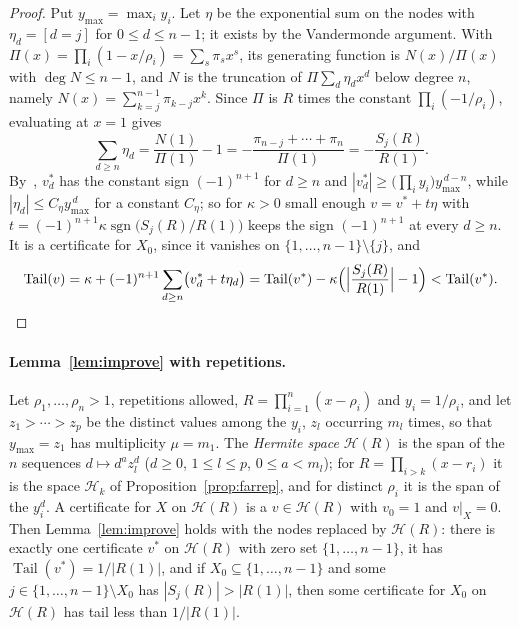 \documentclass[11pt]{article}
\theoremstyle{definition}
\theoremstyle{plain}
\DeclareMathOperator{\Tail}{Tail}
\DeclareMathOperator{\sgn}{sgn}
\begin{document}
\begin{proof}
Put $y_{\max}=\max_iy_i$.  Let $\eta$ be the exponential sum on the nodes with
$\eta_d=[d=j]$ for $0\le d\le n-1$; it exists by the Vandermonde argument.
With $\Pi(x)=\prod_i(1-x/\rho_i)=\sum_s\pi_sx^s$, its generating function is
$N(x)/\Pi(x)$ with $\deg N\le n-1$, and $N$ is the truncation of
$\Pi\sum_d\eta_dx^d$ below degree $n$, namely
$N(x)=\sum_{k=j}^{n-1}\pi_{k-j}x^k$.  Since $\Pi$ is $R$ times the constant
$\prod_i(-1/\rho_i)$, evaluating at $x=1$ gives
\[
  \sum_{d\ge n}\eta_d=\frac{N(1)}{\Pi(1)}-1
  =-\frac{\pi_{n-j}+\cdots+\pi_n}{\Pi(1)}
  =-\frac{S_j(R)}{R(1)} .
\]
By~\cite[Lemma~2.1]{coefficient-mass}, $v^*_d$ has the constant sign $(-1)^{n+1}$ for $d\ge n$
and $|v^*_d|\ge\bigl(\prod_iy_i\bigr)y_{\max}^{\,d-n}$, while
$|\eta_d|\le C_\eta y_{\max}^{\,d}$ for a constant $C_\eta$; so for
$\kappa>0$ small enough $v=v^*+t\eta$ with
$t=(-1)^{n+1}\kappa\sgn\bigl(S_j(R)/R(1)\bigr)$ keeps the sign
$(-1)^{n+1}$ at every $d\ge n$.  It is a certificate for $X_0$, since it vanishes
on $\{1,\ldots,n-1\}\setminus\{j\}$, and
\[
  \Tail(v)=\kappa+(-1)^{n+1}\sum_{d\ge n}\bigl(v^*_d+t\eta_d\bigr)
  =\Tail(v^*)-\kappa\Bigl(\Bigl|\frac{S_j(R)}{R(1)}\Bigr|-1\Bigr)
  <\Tail(v^*).
\]
\end{proof}

\paragraph{Lemma~\ref{lem:improve} with repetitions.}  Let
$\rho_1,\ldots,\rho_n>1$, repetitions allowed, $R=\prod_{i=1}^n(x-\rho_i)$
and $y_i=1/\rho_i$, and let $z_1>\cdots>z_p$ be the distinct values among the
$y_i$, $z_l$ occurring $m_l$ times, so that $y_{\max}=z_1$ has multiplicity
$\mu=m_1$.  The \emph{Hermite space} $\mathcal H(R)$ is the span of the $n$
sequences $d\mapsto d^az_l^d$ ($d\ge0$, $1\le l\le p$, $0\le a<m_l$); for
$R=\prod_{i>k}(x-r_i)$ it is the space $\mathcal H_k$ of
Proposition~\ref{prop:farrep}, and for distinct $\rho_i$ it is the span of
the $y_i^d$.  A certificate for $X$ on $\mathcal H(R)$ is a $v\in\mathcal H(R)$
with $v_0=1$ and $v|_X=0$.  Then Lemma~\ref{lem:improve} holds with the
nodes replaced by $\mathcal H(R)$: there is exactly one certificate $v^*$ on
$\mathcal H(R)$ with zero set $\{1,\ldots,n-1\}$, it has
$\Tail(v^*)=1/|R(1)|$, and if $X_0\subseteq\{1,\ldots,n-1\}$ and some
$j\in\{1,\ldots,n-1\}\setminus X_0$ has $|S_j(R)|>|R(1)|$, then some
certificate for $X_0$ on $\mathcal H(R)$ has tail less than $1/|R(1)|$.
\end{document}
